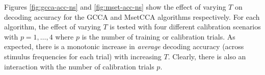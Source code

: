 Figures \ref{fig:gcca-acc-ns} and \ref{fig:mset-acc-ns} show the effect of varying $T$ on decoding accuracy for the GCCA and MsetCCA algorithms respectively. For each algorithm, the effect of varying $T$ is tested with four different calibration scenarios with $p=1,\dots,4$ where $p$ is the number of training or calibration trials. As expected, there is a monotonic increase in \textit{average} decoding accuracy (across stimulus frequencies for each trial) with increasing $T$. Clearly, there is also an interaction with the number of calibration trials $p$.

\begin{figure}[htp]
\hfill
{}

\hfill
{}


\end{figure}
